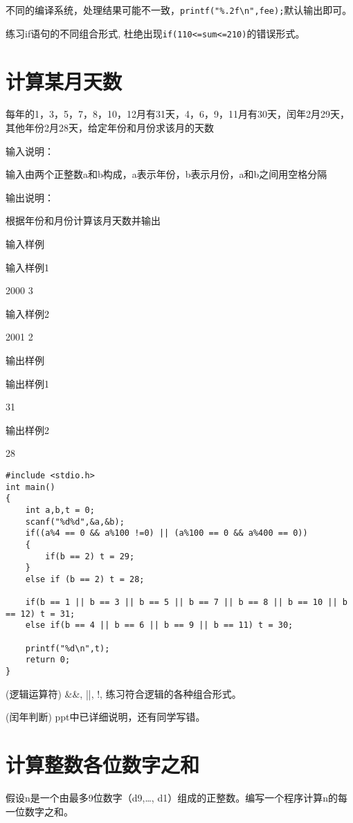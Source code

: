 \begin{note}[四舍五入问题]
	不同的编译系统，处理结果可能不一致，\lstinline|printf("%.2f\n",fee);|默认输出即可。
\end{note}

\begin{note}
	练习if语句的不同组合形式, 杜绝出现\lstinline|if(110<=sum<=210)|的错误形式。
\end{note}

\section{计算某月天数}
每年的1，3，5，7，8，10，12月有31天，4，6，9，11月有30天，闰年2月29天，其他年份2月28天，给定年份和月份求该月的天数

输入说明：

输入由两个正整数a和b构成，a表示年份，b表示月份，a和b之间用空格分隔

输出说明：

根据年份和月份计算该月天数并输出

输入样例	

输入样例1

2000 3

输入样例2

2001 2

输出样例
	
输出样例1

31

输出样例2

28

\begin{lstlisting}
#include <stdio.h>
int main()
{
	int a,b,t = 0;
	scanf("%d%d",&a,&b);
	if((a%4 == 0 && a%100 !=0) || (a%100 == 0 && a%400 == 0))
	{
		if(b == 2) t = 29;
	}
	else if (b == 2) t = 28;
	
	if(b == 1 || b == 3 || b == 5 || b == 7 || b == 8 || b == 10 || b == 12) t = 31;
	else if(b == 4 || b == 6 || b == 9 || b == 11) t = 30; 
	
	printf("%d\n",t);
	return 0;	
}
\end{lstlisting}

\begin{note}(逻辑运算符)
	\&\&, ||, !, 练习符合逻辑的各种组合形式。
\end{note}

\begin{note}(闰年判断)
	ppt中已详细说明，还有同学写错。
\end{note}

\section{计算整数各位数字之和}
假设n是一个由最多9位数字（d9,\dots, d1）组成的正整数。编写一个程序计算n的每一位数字之和。

